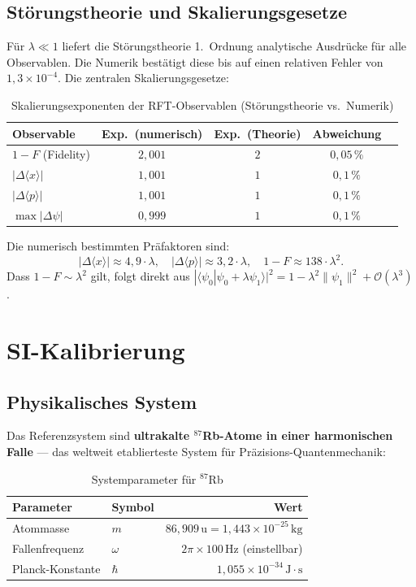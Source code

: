 \documentclass[a4paper,11pt]{article}
\begin{document}
\subsection{Störungstheorie und Skalierungsgesetze}

Für $\lambda \ll 1$ liefert die Störungstheorie 1.~Ordnung analytische
Ausdrücke für alle Observablen. Die Numerik bestätigt diese bis auf einen
relativen Fehler von $1{,}3 \times 10^{-4}$. Die zentralen Skalierungsgesetze:

\begin{table}[h]
\centering
\caption{Skalierungsexponenten der RFT-Observablen (Störungstheorie vs.\ Numerik)}
\begin{tabular}{lcccr}
\toprule
Observable & Exp.\ (numerisch) & Exp.\ (Theorie) & Abweichung \\
\midrule
$1 - F$ (Fidelity) & $2{,}001$ & $2$ & $0{,}05\,\%$ \\
$|\Delta\langle x\rangle|$ & $1{,}001$ & $1$ & $0{,}1\,\%$ \\
$|\Delta\langle p\rangle|$ & $1{,}001$ & $1$ & $0{,}1\,\%$ \\
$\max|\Delta\psi|$ & $0{,}999$ & $1$ & $0{,}1\,\%$ \\
\bottomrule
\end{tabular}
\end{table}

Die numerisch bestimmten Präfaktoren sind:
\[
  |\Delta\langle x\rangle| \approx 4{,}9 \cdot \lambda, \quad
  |\Delta\langle p\rangle| \approx 3{,}2 \cdot \lambda, \quad
  1 - F \approx 138 \cdot \lambda^2.
\]
Dass $1 - F \sim \lambda^2$ gilt, folgt direkt aus
$|\langle\psi_0|\psi_0 + \lambda\psi_1\rangle|^2
= 1 - \lambda^2\|\psi_1\|^2 + \mathcal{O}(\lambda^3)$.

\section{SI-Kalibrierung}

\subsection{Physikalisches System}

Das Referenzsystem sind \textbf{ultrakalte $^{87}$Rb-Atome in einer
harmonischen Falle} --- das weltweit etablierteste System für
Präzisions-Quantenmechanik:

\begin{table}[h]
\centering
\caption{Systemparameter für $^{87}$Rb}
\begin{tabular}{llr}
\toprule
Parameter & Symbol & Wert \\
\midrule
Atommasse & $m$ & $86{,}909\,\mathrm{u} = 1{,}443 \times 10^{-25}\,\mathrm{kg}$ \\
Fallenfrequenz & $\omega$ & $2\pi \times 100\,\mathrm{Hz}$ (einstellbar) \\
Planck-Konstante & $\hbar$ & $1{,}055 \times 10^{-34}\,\mathrm{J\cdot s}$ \\
\bottomrule
\end{tabular}
\end{table}
\end{document}
